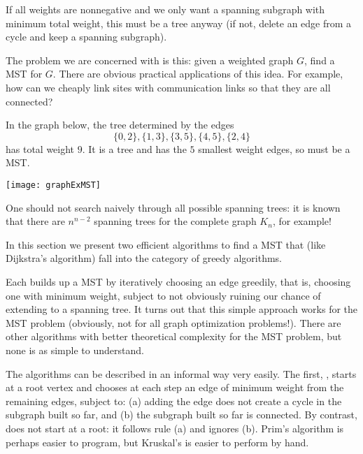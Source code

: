 \begin{note}If all weights are nonnegative and we
only want a spanning subgraph with minimum total weight, this must be a
tree anyway (if not, delete an edge from a cycle and keep a spanning
subgraph).
\end{note}

The problem we are concerned with is this: given a weighted graph $G$,
find a MST for $G$. There are obvious practical applications of this
idea. For example, how can we cheaply link sites with communication
links so that they are all connected?

\begin{Example}
In the graph below, the tree determined by the edges
$$\{0, 2\}, \{1, 3\}, \{3, 5\}, \{4, 5\}, \{2, 4\}$$ 
has total weight $9$. 
It is a tree and has the $5$ smallest weight edges, so must be a MST.
\begin{center}
  \texttt{[image: graphExMST]}
\end{center}
\end{Example}

One should not search naively through all possible spanning trees: it is
known that there are $n^{n-2}$ spanning trees for the complete graph
$K_n$, for example!

In this section we present two efficient algorithms to find a MST that
(like Dijkstra's algorithm) fall into the category of greedy algorithms. 

Each builds up a MST by iteratively choosing an edge greedily, that is,
choosing one with minimum weight, subject to not obviously ruining our
chance of extending to a spanning tree. It turns out that this simple
approach works for the MST problem (obviously, not for all graph
optimization problems!). There are other algorithms with better
theoretical complexity for the MST problem, but none is as simple to
understand.

The algorithms can be described in an informal way very easily. The
first, , starts at a root vertex and chooses
at each step an edge of minimum weight from the remaining edges, subject
to: (a) adding the edge does not create a cycle in the subgraph built so
far, and (b) the subgraph built so far is connected. By contrast,
 does not start at a root: it follows
rule (a) and ignores (b). Prim's algorithm is perhaps easier to program,
but Kruskal's is easier to perform by hand.

